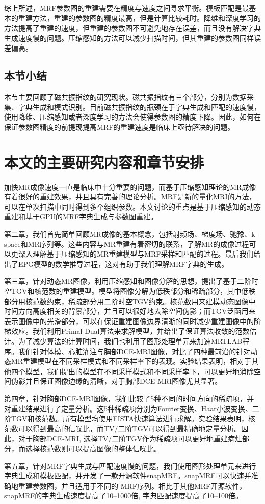 综上所述，MRF参数图的重建需要在精度与速度之间寻求平衡。模板匹配是最基本的重建方法，重建的参数图的精度最高，但是计算比较耗时。降维和深度学习的方法提高了重建的速度，但重建的参数图不可避免地存在误差，而且没有解决字典生成速度慢的问题。压缩感知的方法可以减少扫描时间，但其重建的参数图同样误差偏高。

\subsection{本节小结}
本节主要回顾了磁共振指纹的研究现状。磁共振指纹有三个部分，分别为数据采集、字典生成和模式识别。目前磁共振指纹的瓶颈在于字典生成和匹配的速度慢，使用降维、压缩感知或者深度学习的方法会使得参数图的精度下降。因此，如何在保证参数图精度的前提现提高MRF的重建速度是临床上亟待解决的问题。

\section{本文的主要研究内容和章节安排}
加快MR成像速度一直是临床中十分重要的问题，而基于压缩感知理论的MR成像有着很好的重建效果，并且具有完善的理论分析。MRF是新的量化MRI的方法，可以在单次扫描中同时得到多个组织参数。本文讨论的重点是基于压缩感知的动态重建和基于GPU的MRF字典生成与参数图重建。

第二章，我们首先简单回顾MR成像的基本概念，包括射频场、梯度场、驰豫、k-space和MR序列等。这些内容与MR重建有着密切的联系，了解MR的成像过程可以更深入理解基于压缩感知的MR重建模型与MRF采样和匹配的过程。最后我们给出了EPG模型的数学推导过程，这对有助于我们理解MRF字典的生成。

第三章，针对动态MR图像，利用压缩感知和图像分解的思想，提出了基于二阶时空TGV和核范数的重建模型。模型将图像分解为低秩部分和稀疏部分，其中低秩部分用核范数约束，稀疏部分用二阶时空TGV约束。核范数用来建模动态图像中时间方向高度相关的背景部分，并且可以很好地去除空间伪影；而TGV泛函用来表示图像中的光滑部分，可以在保证重建图像边界清晰的同时减少重建图像中的阶梯效应。我们利用Primal-Dual算法来求解模型，并给出了保证算法收敛的范数估计。为了减少算法的计算时间，我们也利用了图形处理单元来加速MRTLAB程序。我们针对体模、心脏灌注与胸部DCE-MRI图像，对比了四种最前沿的针对动态MR重建模型在不同采样模式和不同采样率下的表现。实验结果表明，相对于其他四个模型，我们提出的模型在不同采样模式和不同采样率下，可以更好地消除空间伪影并且保证图像边缘的清晰，对于胸部DCE-MRI图像尤其显著。

第四章，针对胸部DCE-MRI图像，我们比较了5种不同的时间方向的稀疏项，并对重建结果进行了定量分析。这5种稀疏项分别为Fourier变换、Haar小波变换、二阶TGV和核范数。所有模型均使用FISTA快速算法进行求解。实验结果表明，核范数可以得到最高的信噪比，而TV/二阶TGV可以得到最精确地定量分析。因此，对于胸部DCE-MRI, 选择TV/二阶TGV作为稀疏项可以更好地重建病灶部分，而选择核范数则可以提高图像的整体信噪比。

第五章，针对MRF字典生成与匹配速度慢的问题，我们使用图形处理单元来进行字典生成和模板匹配，并开发了一款开源软件snapMRF。snapMRF可以快速并准确地重建参数图，并且适用于不同的 MRF序列。相比于其他MRF开源软件，snapMRF的字典生成速度提高了10--1000倍, 字典匹配速度提高了10--100倍。








